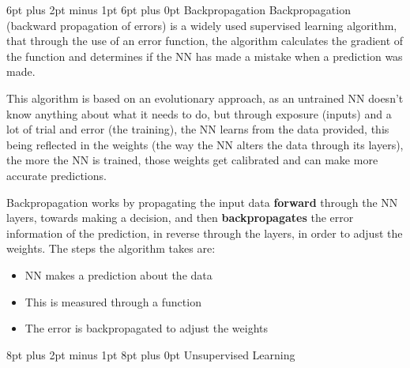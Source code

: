 \documentclass[12pt,a4paper]{article}
\makeatletter
\renewcommand\subsection{\@startsection {subsection}{1}{2mm} %
                               {6pt plus 2pt minus 1pt} %
                               {6pt plus 0pt} %
                               {\normalfont\bfseries}}
\renewcommand\section{\@startsection {section}{1}{0mm} %
                               {8pt plus 2pt minus 1pt} %
                               {8pt plus 0pt} %
                               {\bfseries}}
\makeatother
\begin{document}
	\subsection{Backpropagation}
Backpropagation (backward propagation of errors) is a widely used supervised learning algorithm, that through the use of an error function, the algorithm calculates the gradient of the function and determines if the NN has made a mistake when a prediction was made.\par
This algorithm is based on an evolutionary approach, as an untrained NN doesn’t know anything about what it needs to do, but through exposure (inputs) and a lot of trial and error (the training), the NN learns from the data provided, this being reflected in the weights (the way the NN alters the data through its layers), the more the NN is trained, those weights get calibrated and can make more accurate predictions.\par
Backpropagation works by propagating the input data \textbf{forward} through the NN layers, towards making a decision, and then \textbf{backpropagates} the error information of the prediction, in reverse through the layers, in order to adjust the weights.\cite{chris_nicholson_beginners_2019}  The steps the algorithm takes are:
\begin{itemize}
	\item NN makes a prediction about the data
	\item This is measured through a function
	\item The error is backpropagated to adjust the weights
\end{itemize}
\section{Unsupervised Learning}
\end{document}
